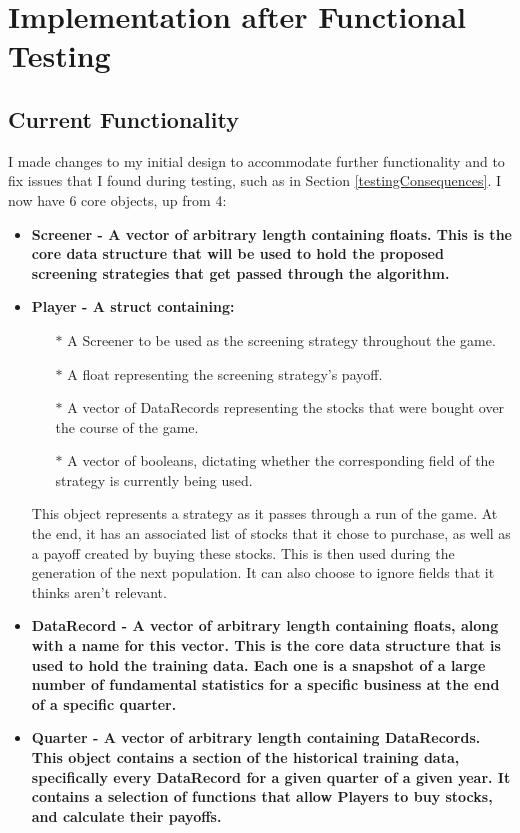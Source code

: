 \section{Implementation after Functional Testing}
\subsection{Current Functionality}
I made changes to my initial design to accommodate further functionality and to fix issues that I found during testing, such as in Section \ref{testingConsequences}. I now have 6 core objects, up from 4:
\begin{itemize}
    \item \bf Screener \rm - A vector of arbitrary length containing floats. This is the core data structure that will be used to hold the proposed screening strategies that get passed through the algorithm.
    \item \bf Player \rm - A struct containing:
    \begin{itemize}
        \item[$\ast$] A Screener to be used as the screening strategy throughout the game.
        \item[$\ast$] A float representing the screening strategy's payoff.
        \item[$\ast$] A vector of DataRecords representing the stocks that were bought over the course of the game.
        \item[$\ast$] A vector of booleans, dictating whether the corresponding field of the strategy is currently being used.
    \end{itemize}
    This object represents a strategy as it passes through a run of the game. At the end, it has an associated list of stocks that it chose to purchase, as well as a payoff created by buying these stocks. This is then used during the generation of the next population. It can also choose to ignore fields that it thinks aren't relevant.
    \item \bf DataRecord \rm - A vector of arbitrary length containing floats, along with a name for this vector. This is the core data structure that is used to hold the training data. Each one is a snapshot of a large number of fundamental statistics for a specific business at the end of a specific quarter.
    \item \bf Quarter \rm - A vector of arbitrary length containing DataRecords. This object contains a section of the historical training data, specifically every DataRecord for a given quarter of a given year. It contains a selection of functions that allow Players to buy stocks, and calculate their payoffs.

\end{itemize}
